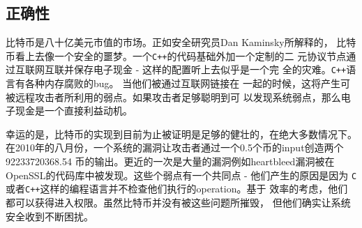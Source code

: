 \documentclass[letterpaper]{article}
\begin{document}
\subsection{正确性}
比特币是八十亿美元市值的市场。正如安全研究员Dan Kaminsky所解释的，
比特币看上去像一个安全的噩梦。一个\verb!C++!的代码基础外加一个定制的二
元协议节点通过互联网互联并保存电子现金 - 这样的配置听上去似乎是一个完
全的灾难。\verb!C++!语言有各种内存腐败的bug。 当他们被通过互联网链接在
一起的时候，这将产生可被远程攻击者所利用的弱点。如果攻击者足够聪明到可
以发现系统弱点，那么电子现金是一个直接利益动机。

幸运的是，比特币的实现到目前为止被证明是足够的健壮的，在绝大多数情况下。
在2010年的八月份，一个系统的漏洞让攻击者通过一个0.5个币的input创造两个
92233720368.54 币的输出。更近的一次是大量的漏洞例如heartbleed漏洞被在
OpenSSL的代码库中被发现。这些个弱点有一个共同点 - 他们产生的原因是因为
\verb!C!或者\verb!C++!这样的编程语言并不检查他们执行的operation。基于
效率的考虑，他们都可以获得进入权限。虽然比特币并没有被这些问题所摧毁，
但他们确实让系统安全收到不断困扰。
\end{document}
